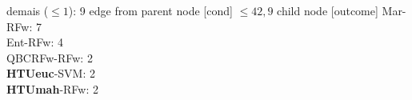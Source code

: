 {{{%
demais ($\leq 1$): 9} edge from parent node [cond] {$\leq42,9$}}
child {node [outcome] {
Mar-RFw: 7\\
Ent-RFw: 4\\
QBCRFw-RFw: 2\\
\textbf{HTUeuc}-SVM: 2\\
\textbf{HTUmah}-RFw: 2\\
}}}
